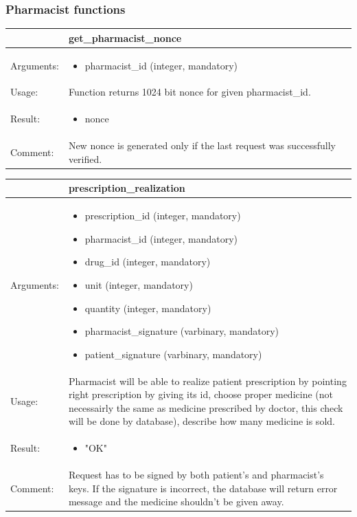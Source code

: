 \subsubsection{Pharmacist functions}


    \begin{longtable}{| p{6cm} | p{7.75cm} |}
    \hline
     & get\_pharmacist\_nonce \\ \hline
    Arguments: &  \begin{itemize}
    	\item pharmacist\_id (integer, mandatory)
	\end{itemize}     \\ \hline
    Usage: & Function returns 1024 bit nonce for given pharmacist\_id. \\ \hline
    Result: & \begin{itemize}
    	\item nonce
	\end{itemize}     \\ \hline	
			Comment: & New nonce is generated only if the last request was successfully verified.\\ \hline
    \end{longtable}


    \begin{longtable}{| p{6cm} | p{7.75cm} |}
    \hline
     & prescription\_realization \\ \hline
    Arguments: &  \begin{itemize}
    	\item prescription\_id (integer, mandatory)
		\item pharmacist\_id (integer, mandatory)
		\item drug\_id (integer, mandatory)
		\item unit (integer, mandatory)
		\item quantity (integer, mandatory)
		\item pharmacist\_signature (varbinary, mandatory)
		\item patient\_signature (varbinary, mandatory)

	\end{itemize}     \\ \hline
    Usage: & Pharmacist will be able to realize patient prescription by pointing right prescription by giving its id, choose proper medicine (not necessairly the same as medicine prescribed by doctor, this check will be done by database), describe how many medicine is sold.\\ \hline
    Result: & \begin{itemize}
    	\item "OK"
	\end{itemize}     \\ \hline	
	Comment: & Request has to be signed by both patient's and pharmacist's keys. If the signature is incorrect, the database will return error message and the medicine shouldn't be given away.\\ \hline
    \end{longtable}


